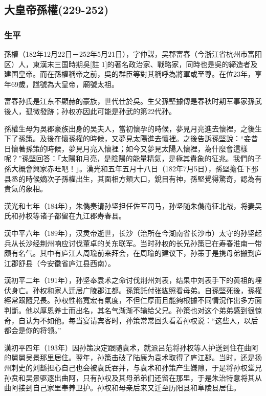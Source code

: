 
\subsection{大皇帝孫權\tiny(229-252)}

\subsubsection{生平}

孫權（182年12月22日－252年5月21日），字仲謀，吴郡富春（今浙江省杭州市富阳区）人，東漢末三国時期吳[註 1]的著名政治家、戰略家，同時也是吳的締造者及建国皇帝。而在孫權稱帝之前，吳的群臣等對其稱呼為將軍或至尊。在位23年，享年69歲，諡號為大皇帝，廟號太祖。

富春孙氏是江东不顯赫的豪族，世代仕於吳。生父孫堅據傳是春秋时期军事家孫武後人，孤微發跡；孙权亦因此可能是孙武的第22代孙。

孫權生母为吳郡豪族出身的吴夫人，當初懷孕的時候，夢見月亮進去懷裡，之後生下了孫策。及後在懷孫權的時候，又夢見太陽進去懷裡。之後告訴孫堅說：“妾昔日懷著孫策的時候，夢見月亮入懷裡；如今又夢見太陽入懷裡，為什麼會這樣呢？”孫堅回答：「太陽和月亮，是陰陽的能量精氣，是極其貴象的征兆。我們的子孫大概會興家赤旺吧！」。漢光和五年五月十八日（182年7月5日），孫堅擔任下邳县丞的時候嫡次子孫權出生，其面相方頰大口，銳目有神，孫堅覺得驚奇，認為有貴氣的象相。

漢光和七年（184年），朱儁奏请孙坚担任佐军司马，孙坚随朱儁南征北战，将妻吴氏和孙权等诸子都留在九江郡寿春县。

漢中平六年（189年），汉灵帝逝世，长沙（治所在今湖南省长沙市）太守的孙坚起兵从长沙经荆州响应讨伐董卓的关东联军。当时孙权的长兄孙策已在寿春淮南一带颇有名气。其中有庐江人周瑜前来拜会，在周瑜的建议下，孙策于是携母弟搬到庐江郡舒县（今安徽省庐江县西南）。

漢初平二年（191年），孙坚奉袁术之命讨伐荆州刘表，结果中刘表手下的黄祖的埋伏身亡。孙权和家人迁居广陵郡江都。孫策託付张紘照看母弟。自孫堅死後，孫權經常跟隨兄長。孙权性格寬宏有氣度，不但仁厚而且能夠根據不同情況作出多方面判斷。他以厚恩养士而出名，其名气渐渐不输给父兄。孙策也对这个弟弟感到很惊奇，自认为不如他。每当宴请宾客时，孙策常常回头看着孙权说：“这些人，以后都会是你的将领。”

漢初平四年（193年）因孙策决定跟随袁术，就派吕范将孙权等人护送到住在曲阿的舅舅吴景那里居住。翌年，孙策击破了陆康为袁术取得了庐江郡。当时，还是扬州刺史的刘繇担心自己也会被袁氏吞并，与袁术和孙策产生嫌隙，于是将孙权堂兄孙贲和吴景驱逐出曲阿，只有孙权及其母弟弟们还留在那里，于是朱治特意将其从曲阿接到自己家里奉养卫护。孙权和母亲后来又迁至历阳县和阜陵县居住。

